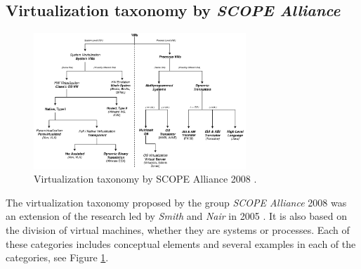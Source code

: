 	\subsection{Virtualization taxonomy by \textit{SCOPE Alliance}}
	
	\begin{figure}[H]
		\centering
		\includegraphics[width=8cm]{images/ScopeAlliance2008.pdf}
		\vspace{-0.2cm}
		\caption{Virtualization taxonomy by SCOPE Alliance 2008 \cite{SCOPEAlliance2008}.}
		\label{fig:TaxonomyVirtualizationSCOPEAlliance2008}
	\end{figure}
	
	The virtualization taxonomy proposed by the group \textit{SCOPE Alliance} 2008 \cite{SCOPEAlliance2008} was an extension of the research led by \textit{Smith} and \textit{Nair} in 2005 \cite{Smith2005}. It is also based on the division of virtual machines, whether they are systems or processes. Each of these categories includes conceptual elements and several examples in each of the categories, see Figure \ref{fig:TaxonomyVirtualizationSCOPEAlliance2008}. 
	
	
	
